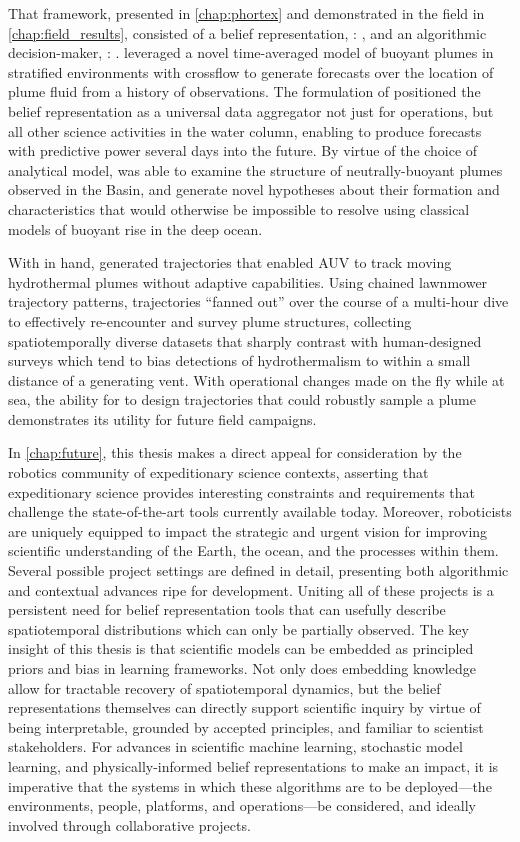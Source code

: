 That framework, presented in \cref{chap:phortex} and demonstrated in the field in \cref{chap:field_results}, consisted of a belief representation, \PHUMES: \phumes, and an algorithmic decision-maker, \PHORTEX: \phortex. \PHUMES leveraged a novel time-averaged model of buoyant plumes in stratified environments with crossflow to generate forecasts over the location of plume fluid from a history of observations. The formulation of \PHUMES positioned the belief representation as a universal data aggregator not just for \Sentry operations, but all other science activities in the water column, enabling \PHUMES to produce forecasts with predictive power several days into the future. By virtue of the choice of analytical model, \PHUMES was able to examine the structure of neutrally-buoyant plumes observed in the Basin, and generate novel hypotheses about their formation and characteristics that would otherwise be impossible to resolve using classical models of buoyant rise in the deep ocean.

With \PHUMES in hand, \PHORTEX generated trajectories that enabled AUV \Sentry to track moving hydrothermal plumes without adaptive capabilities. Using chained lawnmower trajectory patterns, \PHORTEX trajectories ``fanned out'' over the course of a multi-hour dive to effectively re-encounter and survey plume structures, collecting spatiotemporally diverse datasets that sharply contrast with human-designed surveys which tend to bias detections of hydrothermalism to within a small distance of a generating vent. With operational changes made on the fly while at sea, the ability for \PHORTEX to design trajectories that could robustly sample a plume demonstrates its utility for future field campaigns. 

In \cref{chap:future}, this thesis makes a direct appeal for consideration by the robotics community of expeditionary science contexts, asserting that expeditionary science provides interesting constraints and requirements that challenge the state-of-the-art tools currently available today. Moreover, roboticists are uniquely equipped to impact the strategic and urgent vision for improving scientific understanding of the Earth, the ocean, and the processes within them. Several possible project settings are defined in detail, presenting both algorithmic and contextual advances ripe for development. Uniting all of these projects is a persistent need for belief representation tools that can usefully describe spatiotemporal distributions which can only be partially observed. The key insight of this thesis is that scientific models can be embedded as principled priors and bias in learning frameworks. Not only does embedding knowledge allow for tractable recovery of spatiotemporal dynamics, but the belief representations themselves can directly support scientific inquiry by virtue of being interpretable, grounded by accepted principles, and familiar to scientist stakeholders. For advances in scientific machine learning, stochastic model learning, and physically-informed belief representations to make an impact, it is imperative that the systems in which these algorithms are to be deployed---the environments, people, platforms, and operations---be considered, and ideally involved through collaborative projects.

